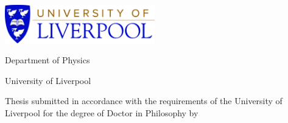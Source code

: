 \begin{titlepage}
	\centering
	\vspace*{1cm}
	\includegraphics[width=65mm]{Figures/UoL_Logo.jpg}\par\vspace{1cm}
		\vspace{2cm}
	{\huge \Title\par}
	\vspace{2cm}
	{Department of Physics \par}
	{University of Liverpool \par}
	\vspace{2cm}
	{Thesis submitted in accordance with the requirements of the University of Liverpool for the degree of Doctor in Philosophy by  \par}
	\vspace{1cm}
	{\textbf{\Author}\par}
	\vfill

	{\large \monthname\, \the\year\par}
\end{titlepage}